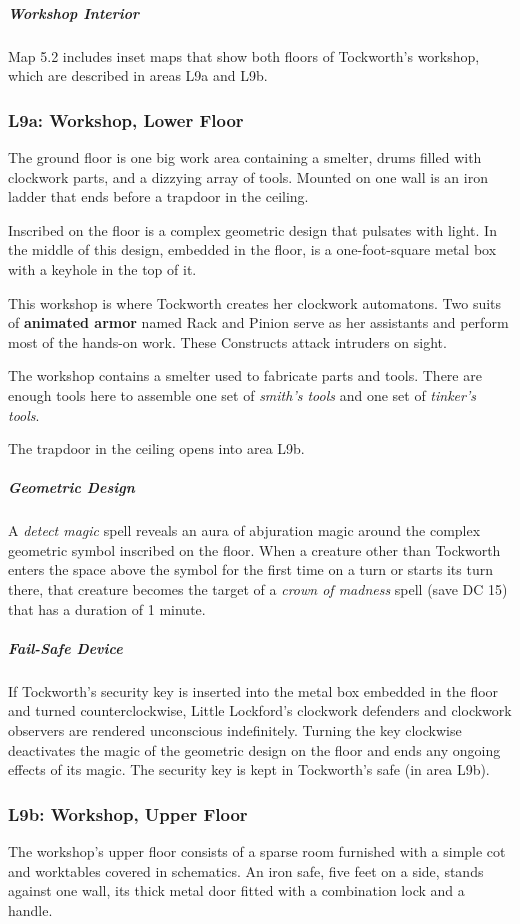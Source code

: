 \documentclass[10pt,a4paper,twoside,bg=print,twocolumn,openany,nodeprecatedcode]{dndbook}
\begin{document}
\subparagraph{Workshop Interior}
Map 5.2 includes inset maps that show both floors of Tockworth's workshop, which are described in areas L9a and L9b.

\subsubsection{L9a: Workshop, Lower Floor}
\begin{DndReadAloud}{}
The ground floor is one big work area containing a smelter, drums filled with clockwork parts, and a dizzying array of tools. Mounted on one wall is an iron ladder that ends before a trapdoor in the ceiling.

Inscribed on the floor is a complex geometric design that pulsates with light. In the middle of this design, embedded in the floor, is a one-foot-square metal box with a keyhole in the top of it.

\end{DndReadAloud}

This workshop is where Tockworth creates her clockwork automatons. Two suits of \textbf{animated armor} named Rack and Pinion serve as her assistants and perform most of the hands-on work. These Constructs attack intruders on sight.

The workshop contains a smelter used to fabricate parts and tools. There are enough tools here to assemble one set of \textit{smith's tools} and one set of \textit{tinker's tools}.

The trapdoor in the ceiling opens into area L9b.

\subparagraph{Geometric Design}
A \textit{detect magic} spell reveals an aura of abjuration magic around the complex geometric symbol inscribed on the floor. When a creature other than Tockworth enters the space above the symbol for the first time on a turn or starts its turn there, that creature becomes the target of a \textit{crown of madness} spell (save DC 15) that has a duration of 1 minute.

\subparagraph{Fail-Safe Device}
If Tockworth's security key is inserted into the metal box embedded in the floor and turned counterclockwise, Little Lockford's clockwork defenders and clockwork observers are rendered unconscious indefinitely. Turning the key clockwise deactivates the magic of the geometric design on the floor and ends any ongoing effects of its magic. The security key is kept in Tockworth's safe (in area L9b).

\subsubsection{L9b: Workshop, Upper Floor}
\begin{DndReadAloud}{}
The workshop's upper floor consists of a sparse room furnished with a simple cot and worktables covered in schematics. An iron safe, five feet on a side, stands against one wall, its thick metal door fitted with a combination lock and a handle.

\end{DndReadAloud}
\end{document}
